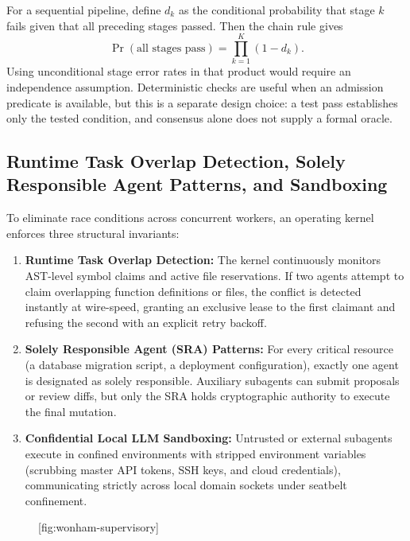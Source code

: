 For a sequential pipeline, define $d_k$ as the conditional probability that stage $k$ fails given that all preceding stages passed. Then the chain rule gives
\begin{equation}
\Pr(\text{all stages pass})=\prod_{k=1}^{K}(1-d_k).
\end{equation}
Using unconditional stage error rates in that product would require an independence assumption. Deterministic checks are useful when an admission predicate is available, but this is a separate design choice: a test pass establishes only the tested condition, and consensus alone does not supply a formal oracle.

\subsection{Runtime Task Overlap Detection, Solely Responsible Agent Patterns, and Sandboxing}

To eliminate race conditions across concurrent workers, an operating kernel enforces three structural invariants:
\begin{enumerate}[leftmargin=1.8em,itemsep=2pt]
  \item \textbf{Runtime Task Overlap Detection:} The kernel continuously monitors AST-level symbol claims and active file reservations. If two agents attempt to claim overlapping function definitions or files, the conflict is detected instantly at wire-speed, granting an exclusive lease to the first claimant and refusing the second with an explicit retry backoff.
  \item \textbf{Solely Responsible Agent (SRA) Patterns:} For every critical resource (a database migration script, a deployment configuration), exactly one agent is designated as solely responsible. Auxiliary subagents can submit proposals or review diffs, but only the SRA holds cryptographic authority to execute the final mutation.
  \item \textbf{Confidential Local LLM Sandboxing:} Untrusted or external subagents execute in confined environments with stripped environment variables (scrubbing master API tokens, SSH keys, and cloud credentials), communicating strictly across local domain sockets under seatbelt confinement.
\end{enumerate}

\begin{figure}[tp]
  \centering
  [fig:wonham-supervisory]
\end{figure}

